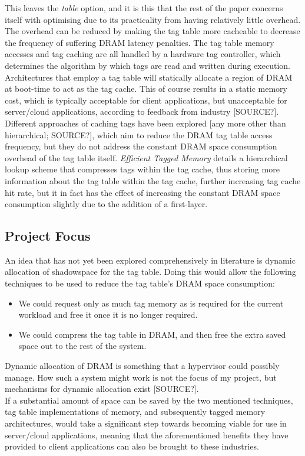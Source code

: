 \documentclass[10pt,a4paper]{article}
\begin{document}
This leaves the \textit{table} option, and it is this that the rest of the paper concerns itself with optimising due to its practicality from having relatively little overhead. The overhead can be reduced by making the tag table more cacheable to decrease the frequency of suffering DRAM latency penalties. The tag table memory accesses and tag caching are all handled by a hardware tag controller, which determines the algorithm by which tags are read and written during execution.\\
Architectures that employ a tag table will statically allocate a region of DRAM at boot-time to act as the tag cache. This of course results in a static memory cost, which is typically acceptable for client applications, but unacceptable for server/cloud applications, according to feedback from industry [SOURCE?]. Different approaches of caching tags have been explored [any more other than hierarchical; SOURCE?], which aim to reduce the DRAM tag table access frequency, but they do not address the constant DRAM space consumption overhead of the tag table itself. \textit{Efficient Tagged Memory} details a hierarchical lookup scheme that compresses tags within the tag cache, thus storing more information about the tag table within the tag cache, further increasing tag cache hit rate, but it in fact has the effect of increasing the constant DRAM space consumption slightly due to the addition of a first-layer.\\

\subsection*{Project Focus}
An idea that has not yet been explored comprehensively in literature is dynamic allocation of shadowspace for the tag table. Doing this would allow the following techniques to be used to reduce the tag table's DRAM space consumption:
\begin{itemize}
\item We could request only as much tag memory as is required for the current workload and free it once it is no longer required.
\item We could compress the tag table in DRAM, and then free the extra saved space out to the rest of the system.
\end{itemize}
Dynamic allocation of DRAM is something that a hypervisor could possibly manage. How such a system might work is not the focus of my project, but mechanisms for dynamic allocation exist [SOURCE?].\\
If a substantial amount of space can be saved by the two mentioned techniques, tag table implementations of memory, and subsequently tagged memory architectures, would take a significant step towards becoming viable for use in server/cloud applications, meaning that the aforementioned benefits they have provided to client applications can also be brought to these industries.
\end{document}

